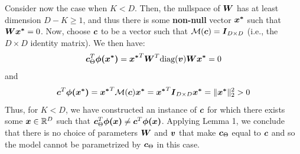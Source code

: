 \documentclass{exam}
\begin{document}
\begin{questions}
        Consider now the case when $K < D$. Then, the nullspace of $\vb*{W}$ has at least dimension $D - K \ge 1$, and thus there is some \textbf{non-null} vector $\vb*{x^*}$ such that $\vb*{Wx^*} = 0$. Now, choose $\vb*{c}$ to be a vector such that $\mathcal{M}(\vb*{c}) = \vb*{I}_{D \times D}$ (i.e., the $D \times D$ identity matrix). We then have:
        \[
            \vb*{c}^T_{\Theta} \vb*{\phi(x^*)}
            = \vb*{x^*}^T \vb*{W}^T \text{diag}(\vb*{v}) \vb*{Wx^*} = 0
        \]
        and
        \[
            \vb*{c}^T \vb*{\phi(x^*)} = \vb*{x^*}^T \mathcal{M}(\vb*{c}) \vb*{x^*} = \vb*{x^*}^T \vb*{I}_{D \times D} \vb*{x^*} = \|\vb*{x^*}\|_2^2 > 0 
        \]
        Thus, for $K < D$, we have constructed an instance of $\vb*{c}$ for which there exists some $\vb*{x} \in \mathbb{R}^{D}$ such that  $\vb*{c}^T_{\Theta} \vb*{\phi(x)} \neq \vb*{c}^T \vb*{\phi(x)}$. Applying Lemma 1, we conclude that there is no choice of parameters $\vb*{W}$ and $\vb*{v}$ that make $\vb*{c}_{\Theta}$ equal to $\vb*{c}$ and so the model cannot be parametrized by $\vb*{c}_{\Theta}$ in this case.


\end{questions}
\end{document}
